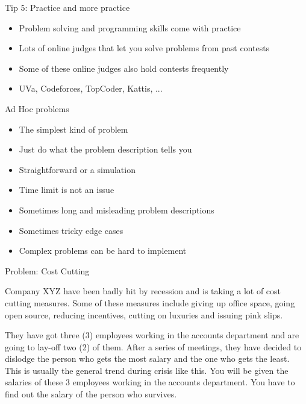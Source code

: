 \documentclass[12pt,t]{beamer}
\newcommand{\bi}{\begin{itemize}}
\newcommand{\ei}{\end{itemize}}
\begin{document}
\begin{frame}{Tip 5: Practice and more practice}
    \vspace{30pt}
    \bi
        \item Problem solving and programming skills come with practice
        \item Lots of online judges that let you solve problems from past contests
        \item Some of these online judges also hold contests frequently
        \item UVa, Codeforces, TopCoder, Kattis, ...
    \ei
\end{frame}


{
}

\begin{frame}{Ad Hoc problems}
    \vspace{30pt}
    \bi
        \item The simplest kind of problem
        \item Just do what the problem description tells you
        \item Straightforward or a simulation
        \item Time limit is not an issue
        \item Sometimes long and misleading problem descriptions
        \item Sometimes tricky edge cases
        \item Complex problems can be hard to implement
    \ei
\end{frame}

\begin{frame}{Problem: Cost Cutting}

{
    \small
    \vspace{20pt}
Company XYZ have been badly hit by recession and is taking a lot of cost cutting measures. Some of these measures include giving up office space, going open source, reducing incentives, cutting on luxuries and issuing pink slips.

\vspace{10pt}

They have got three (3) employees working in the accounts department and are going to lay-off two (2) of them. After a series of meetings, they have decided to dislodge the person who gets the most salary and the one who gets the least. This is usually the general trend during crisis like this.
You will be given the salaries of these 3 employees working in the accounts department. You have to find out the salary of the person who survives.
}

\end{frame}
\end{document}
